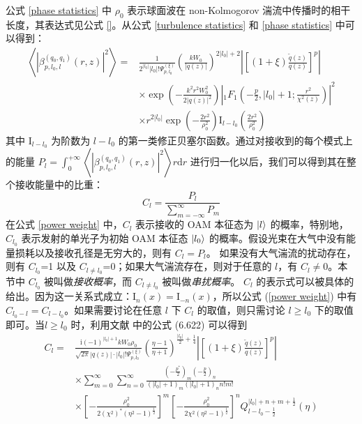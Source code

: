 \documentclass[master]{thesis-uestc}
\begin{document}
\noindent 公式 \eqref{phase statistics} 中 $\rho_0$ 表示球面波在 non-Kolmogorov 湍流中传播时的相干长度，其表达式见公式 \ref{}。从公式 \eqref{turbulence statistics} 和 \eqref{phase statistics} 中可以得到：
\begin{equation}\label{turbulence statistics simple}
  \begin{array}{rl}
    \left<\left|\beta^{(q_0,q_1)}_{p,l_0,l}(r,z)\right|^2\right>=&\displaystyle\frac{1}{2^{\left|l_0\right|}\left|l_0\right|!\Psi^{(\xi)}_{p,l_0}}
    \left(\frac{kW_0}{\left|q(z)\right|}\right)^{2\left|l_0\right|+2}\left|\left[(1+\xi)\frac{\widetilde{q}(z)}{q(z)}\right]^p\right|\\[0.5cm]
    &\times\displaystyle\exp\left(-\frac{k^2r^2W^2_0}{2\left|q(z)\right|^2}\right)\left|{}_1F_1\left(-\frac{p}{2},\left|l_0\right|+1;\frac{r^2}{\chi^2(z)}\right)\right|^2\\[0.5cm]
    &\times\displaystyle
    r^{2\left|l_0\right|}\exp\left(-\frac{2r^2}{\rho^2_0}\right)\mathrm{I}_{l-l_0}\left(\frac{2r^2}{\rho^2_0}\right)
  \end{array}
\end{equation}
\noindent 其中 $\mathrm{I}_{l-l_0}$ 为阶数为 $l-l_0$ 的第一类修正贝塞尔函数。通过对接收到的每个模式上的能量 $P_l=\int_0^{+\infty}\left<\left|\beta^{(q_0,q_1)}_{p,l_0,l}(r,z)\right|^2\right>r\mathrm{d}r$ 进行归一化以后，我们可以得到其在整个接收能量中的比重：
\begin{equation}\label{power weight}
  C_l=\frac{P_l}{\sum_{m=-\infty}^\infty P_m}
\end{equation}
\noindent 在公式 \eqref{power weight} 中，$C_{l}$ 表示接收的 OAM 本征态为 $\ket{l}$ 的概率，特别地，$C_{l_0}$ 表示发射的单光子为初始 OAM 本征态 $\ket{l_0}$ 的概率。假设光束在大气中没有能量损耗以及接收孔径是无穷大的，则有 $C_l=P_l$。 如果没有大气湍流的扰动存在，则有 $C_{l_0}$=1 以及 $C_{l\neq l_0}$=0；如果大气湍流存在，则对于任意的 $l$，有 $C_{l}\neq0$。本节中 $C_{l_0}$ 被叫做\textit{接收概率}，而 $C_{l\neq l_0}$ 被叫做\textit{串扰概率}。
$C_{l}$ 的表示式可以被具体的给出。因为这一关系式成立：$\mathrm{I}_n(x)= \mathrm{I}_{-n}(x)$，所以公式 (\ref{power weight}) 中有 $C_{l_0-l}=C_{l-l_0}$。如果需要讨论在任意 $l$ 下 $C_{l}$ 的取值，则只需讨论 $l\geq l_0$ 下的取值即可。当$l\geq l_0$ 时，利用文献\cite{} 中的公式 (6.622) 可以得到
\begin{equation}\label{detail power weight}
  \begin{array}{rl}
    C_l=&\displaystyle\frac{\mathrm{i}(-1)^{\left|l_0\right|+1}kW_0\rho_0}{\sqrt{2\pi}\left|q(z)\right|\cdot\left|l_0\right|!\Psi^{(\xi)}_{p,l_0}}\left(\frac{\eta-1}{\eta+1}\right)^{\frac{\left|l_0\right|}{2}+\frac14}\left|\left[(1+\xi)\frac{\widetilde{q}(z)}{q(z)}\right]^p\right|\\[0.5cm]
    &\displaystyle\times\sum\limits_{m=0}^\infty\sum\limits_{n=0}^\infty\frac{\left(-\frac{p^*}{2}\right)_m\left(-\frac{p}{2}\right)_n}{\left(\left|l_0\right|+1\right)_m\left(\left|l_0\right|+1\right)_nn!m!}\\[0.5cm]
    &\displaystyle\times\left[-\frac{\rho_0^2}{2(\chi^2)^*\left(\eta^2-1\right)^\frac12}\right]^m\left[-\frac{\rho_0^2}{2\chi^2\left(\eta^2-1\right)^\frac12}\right]^{n}Q^{\left|l_0\right|+n+m+\frac12}_{l-l_0-\frac12}(\eta)
  \end{array}
\end{equation}
\end{document}
